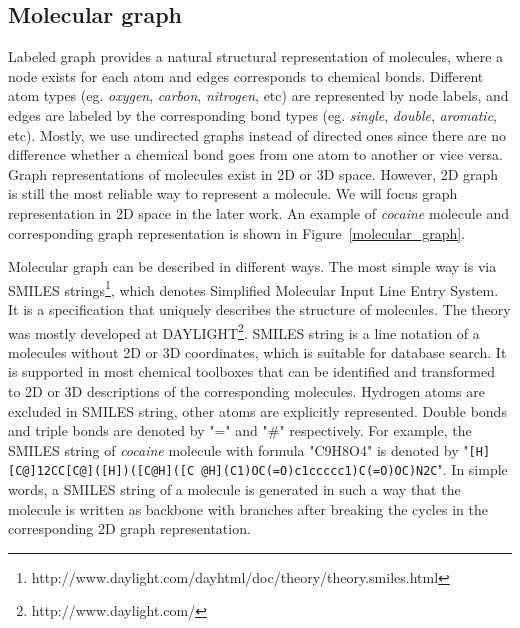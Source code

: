 \documentclass[english]{tktltiki}
\begin{document}
\subsection{Molecular graph}

Labeled graph provides a natural structural representation of molecules, where a node exists for each atom and edges corresponds to chemical bonds. Different atom types (eg. {\em oxygen}, {\em carbon}, {\em nitrogen}, etc) are represented by node labels, and edges are labeled by the corresponding bond types (eg. {\em single}, {\em double}, {\em aromatic}, etc). Mostly, we use undirected graphs instead of directed ones since there are no difference whether a chemical bond goes from one atom to another or vice versa. Graph representations of molecules exist in 2D or 3D space. However, 2D graph is still the most reliable way to represent a molecule. We will focus graph representation in 2D space in the later work. An example of {\em cocaine} molecule and corresponding graph representation is shown in Figure~\ref{molecular_graph}.




Molecular graph can be described in different ways. The most simple way is via SMILES strings\footnote{http://www.daylight.com/dayhtml/doc/theory/theory.smiles.html}, which denotes Simplified Molecular Input Line Entry System. It is a specification that uniquely describes the structure of molecules. The theory was mostly developed at DAYLIGHT\footnote{http://www.daylight.com/}. SMILES string is a line notation of a molecules without 2D or 3D coordinates, which is suitable for database search. It is supported in most chemical toolboxes that can be identified and transformed to 2D or 3D descriptions of the corresponding molecules. Hydrogen atoms are excluded in SMILES string, other atoms are explicitly represented. Double bonds and triple bonds are denoted by "=" and "\#" respectively. For example, the SMILES string of {\em cocaine} molecule with formula "C9H8O4" is denoted by "\texttt{[H][C@]12CC[C@]([H])([C@H]([C @H](C1)OC(=O)c1ccccc1)C(=O)OC)N2C}". In simple words, a SMILES string of a molecule is generated in such a way that the molecule is written as backbone with branches after breaking the cycles in the corresponding 2D graph representation.
\end{document}
